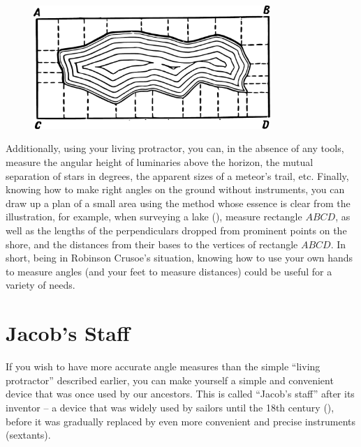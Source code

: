 \begin{figure}[h!]
\centering
\includegraphics[width=0.8\textwidth]{figures/ch-03/fig-068.pdf}
\end{figure}

Additionally, using your living protractor, you can, in the absence of any tools, measure the angular height of luminaries above the horizon, the mutual separation of stars in degrees, the apparent sizes of a meteor's trail, etc. Finally, knowing how to make right angles on the ground without instruments, you can draw up a plan of a small area using the method whose essence is clear from the illustration, for example, when surveying a lake (), measure rectangle $ABCD$, as well as the lengths of the perpendiculars dropped from prominent points on the shore, and the distances from their bases to the vertices of rectangle $ABCD$. In short, being in Robinson Crusoe's situation, knowing how to use your own hands to measure angles (and your feet to measure distances) could be useful for a variety of needs.

\section{Jacob's Staff}
\label{sec-3.8}

If you wish to have more accurate angle measures than the simple ``living protractor'' described earlier, you can make yourself a simple and convenient device that was once used by our ancestors. This is called ``Jacob's staff'' after its inventor -- a device that was widely used by sailors until the 18th century (), before it was gradually replaced by even more convenient and precise instruments (sextants).

